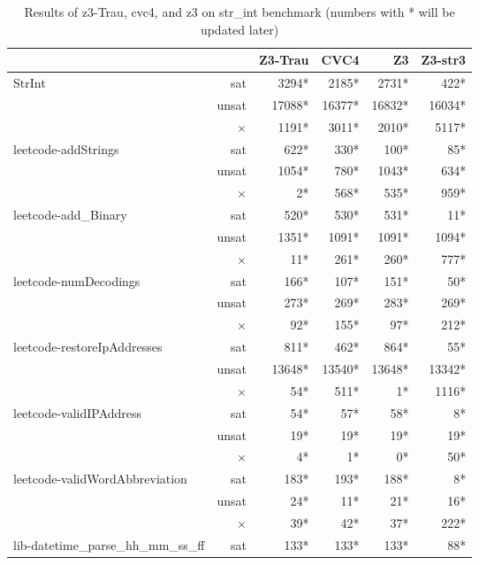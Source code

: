 \begin{table*}[t]
\centering
\caption{Results of z3-Trau, cvc4, and z3 on str\_int benchmark (numbers with * will be updated later)}
\begin{tabular}{l r | r r r r}
\hline
\multicolumn{2}{c}{}                   & Z3-Trau & CVC4   &    Z3  & Z3-str3 \\ \hline
\multirow{3}{*}{StrInt}		& sat      &   3294*  &  2185* &  2731* &    422* \\ 
							& unsat    &  17088*  & 16377* & 16832* &  16034* \\
							& $\times$ &   1191*  &  3011* &  2010* &   5117* \\ \hline \hline
\multirow{3}{*}{leetcode-addStrings}	& sat & 622*  &  330* &  100* &  85* \\ 
							& unsat    &  1054*  & 780* & 1043* &  634* \\
							& $\times$ &  2*  &  568* &  535* & 959* \\ \hline
\multirow{3}{*}{leetcode-add\_Binary}	& sat & 520*  &  530* &  531* &  11* \\ 
							& unsat    &  1351*  & 1091* & 1091* &  1094* \\
							& $\times$ &  11*  &  261* &  260* & 777* \\ \hline
\multirow{3}{*}{leetcode-numDecodings}	& sat & 166*  &  107* &  151* &  50* \\ 
							& unsat    &  273*  & 269* & 283* &  269* \\
							& $\times$ &  92*  &  155* &  97* & 212* \\ \hline
\multirow{3}{*}{leetcode-restoreIpAddresses}	& sat & 811*  &  462* &  864* &  55* \\ 
							& unsat    &  13648*  & 13540* & 13648* &  13342* \\
							& $\times$ &  54*  &  511* &  1* & 1116* \\ \hline
\multirow{3}{*}{leetcode-validIPAddress}	& sat & 54*  &  57* &  58* &  8* \\ 
							& unsat    &  19*  & 19* & 19* &  19* \\
							& $\times$ &  4*  &  1* &  0* & 50* \\ \hline
\multirow{3}{*}{leetcode-validWordAbbreviation}	& sat & 183*  &  193* &  188* &  8* \\ 
							& unsat    &  24*  & 11* & 21* &  16* \\
							& $\times$ &  39*  &  42* &  37* & 222* \\ \hline
\multirow{3}{*}{lib-datetime\_parse\_hh\_mm\_ss\_ff}	& sat &  133*  & 133* &  133* &  88* \\ 

\end{tabular}
\end{table*}
